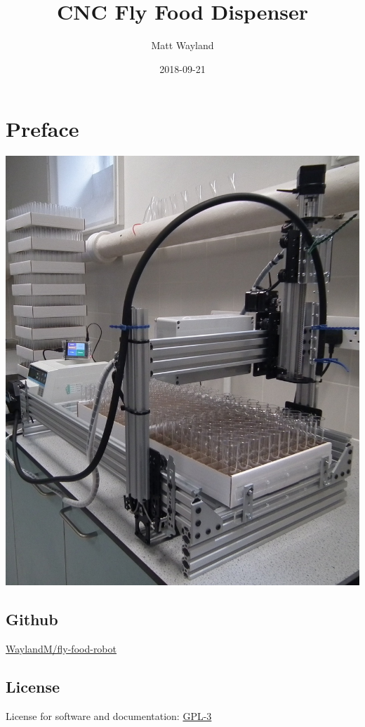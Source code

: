 \documentclass[]{book}
\title{CNC Fly Food Dispenser}
\author{Matt Wayland}
\date{2018-09-21}
\theoremstyle{definition}
\theoremstyle{definition}
\theoremstyle{definition}
\theoremstyle{remark}
\begin{document}
\maketitle

{
\setcounter{tocdepth}{1}
\tableofcontents
}
\chapter*{Preface}\label{preface}

\begin{center}\includegraphics[width=0.75\linewidth]{images/system} \end{center}

\section*{Github}\label{github}

\href{https://github.com/WaylandM/fly-food-robot}{WaylandM/fly-food-robot}

\section*{License}\label{license}

License for software and documentation:
\href{https://www.gnu.org/licenses/gpl-3.0.en.html}{GPL-3}
\end{document}
